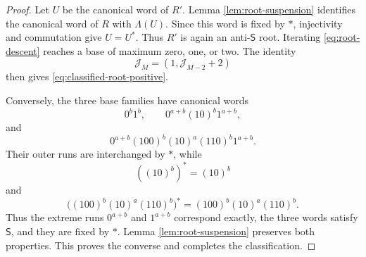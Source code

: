 \documentclass[10pt,a4paper]{amsart}
\newcommand{\Lam}{\Lambda}
\newcommand{\Star}{*}
\begin{document}
\begin{proof}
Let \(U\) be the canonical word of \(R'\).  Lemma
\ref{lem:root-suspension} identifies the canonical word of \(R\) with
\(\Lam(U)\).  Since this word is fixed by \(\Star\), injectivity and
commutation give \(U=U^{\Star}\).  Thus \(R'\) is again an anti-\(\mathsf S\)
root.  Iterating \eqref{eq:root-descent} reaches a base of maximum zero, one,
or two.  The identity
\[
 \mathcal J_M=(1,\mathcal J_{M-2}+2)
\]
then gives \eqref{eq:classified-root-positive}.

Conversely, the three base families have canonical words
\[
 0^b1^b,
 \qquad
 0^{a+b}(10)^b1^{a+b},
\]
and
\[
 0^{a+b}(100)^b(10)^a(110)^b1^{a+b}.
\]
Their outer runs are interchanged by \(\Star\), while
\[
 ((10)^b)^{\Star}=(10)^b
\]
and
\[
 \bigl((100)^b(10)^a(110)^b\bigr)^{\Star}
 =(100)^b(10)^a(110)^b.
\]
Thus the extreme runs \(0^{a+b}\) and \(1^{a+b}\) correspond exactly, the
three words satisfy \(\mathsf S\), and they are fixed by \(\Star\).  Lemma
\ref{lem:root-suspension} preserves both properties.  This proves the
converse and completes the classification.
\end{proof}
\end{document}
